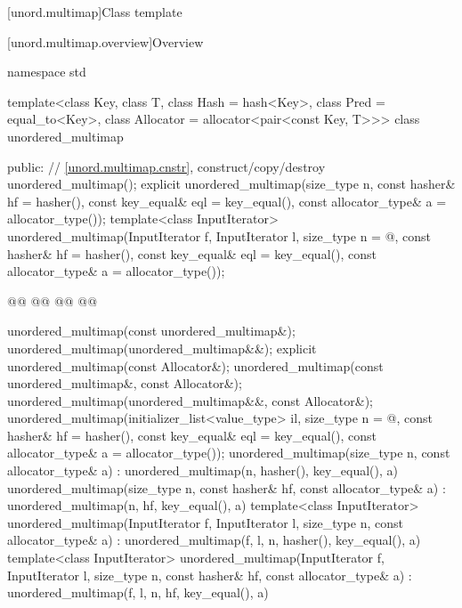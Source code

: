 \documentclass{wg21}
\begin{document}
[unord.multimap]{Class template }%

[unord.multimap.overview]{Overview}

%
\begin{codeblock}
namespace std {
template<class Key,
class T,
class Hash = hash<Key>,
class Pred = equal_to<Key>,
class Allocator = allocator<pair<const Key, T>>>
class unordered_multimap {
    public:
    // \ref{unord.multimap.cnstr}, construct/copy/destroy
    unordered_multimap();
    explicit unordered_multimap(size_type n,
    const hasher& hf = hasher(),
    const key_equal& eql = key_equal(),
    const allocator_type& a = allocator_type());
    template<class InputIterator>
    unordered_multimap(InputIterator f, InputIterator l,
        size_type n = @\seebelow@,
        const hasher& hf = hasher(),
        const key_equal& eql = key_equal(),
        const allocator_type& a = allocator_type());
    
    @@
    @@
    @@
    @@
        
    unordered_multimap(const unordered_multimap&);
    unordered_multimap(unordered_multimap&&);
    explicit unordered_multimap(const Allocator&);
    unordered_multimap(const unordered_multimap&, const Allocator&);
    unordered_multimap(unordered_multimap&&, const Allocator&);
    unordered_multimap(initializer_list<value_type> il,
    size_type n = @\seebelow@,
    const hasher& hf = hasher(),
    const key_equal& eql = key_equal(),
    const allocator_type& a = allocator_type());
    unordered_multimap(size_type n, const allocator_type& a)
    : unordered_multimap(n, hasher(), key_equal(), a) { }
    unordered_multimap(size_type n, const hasher& hf, const allocator_type& a)
    : unordered_multimap(n, hf, key_equal(), a) { }
    template<class InputIterator>
    unordered_multimap(InputIterator f, InputIterator l, size_type n, const allocator_type& a)
    : unordered_multimap(f, l, n, hasher(), key_equal(), a) { }
    template<class InputIterator>
    unordered_multimap(InputIterator f, InputIterator l, size_type n, const hasher& hf,
    const allocator_type& a)
    : unordered_multimap(f, l, n, hf, key_equal(), a) { }
    
}}
\end{codeblock}
\end{document}
